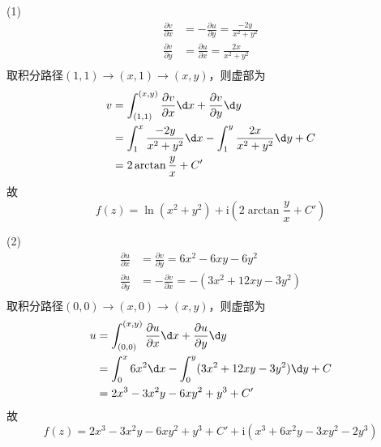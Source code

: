\documentclass{phyasgn}
\renewcommand{\i}{\mathrm{i}}
\begin{document}
 \begin{sol}[3]
    (1)$$\begin{aligned}
        \frac{\partial v}{\partial x}&=-\frac{\partial u}{\partial y}=\frac{-2y}{x^2+y^2}\\
        \frac{\partial v}{\partial y}&=\frac{\partial u}{\partial x}=\frac{2x}{x^2+y^2}\\
    \end{aligned}$$
    取积分路径$(1,1)\to(x,1)\to(x,y)$，则虚部为
    $$\begin{aligned}
        v&=\int_{(1,1)}^{(x,y)}\frac{\partial v}{\partial x}\d x+\frac{\partial v}{\partial y}\d y\\
        &=\int_1^x\frac{-2y}{x^2+y^2}\d x-\int_1^y\frac{2x}{x^2+y^2}\d y+C\\
        &=2\arctan\frac{y}{x}+C'
    \end{aligned}$$
    故
    $$f(z)=\ln(x^2+y^2)+\i (2\arctan\frac{y}{x}+C')$$\par
    (2)$$\begin{aligned}
        \frac{\partial u}{\partial x}&=\frac{\partial v}{\partial y}=6x^2-6xy-6y^2\\
        \frac{\partial u}{\partial y}&=-\frac{\partial v}{\partial x}=-(3x^2+12xy-3y^2)\\
    \end{aligned}$$
    取积分路径$(0,0)\to(x,0)\to(x,y)$，则虚部为
    $$\begin{aligned}
        u&=\int_{(0,0)}^{(x,y)}\frac{\partial u}{\partial x}\d x+\frac{\partial u}{\partial y}\d y\\
        &=\int_0^x6x^2\d x-\int_0^y(3x^2+12xy-3y^2)\d y+C\\
        &=2x^3-3x^2y-6xy^2+y^3+C'
    \end{aligned}$$
    故
    $$f(z)=2x^3-3x^2y-6xy^2+y^3+C'+\i (x^3+6x^2y-3xy^2-2y^3)$$
 \end{sol}\par
\end{document}

